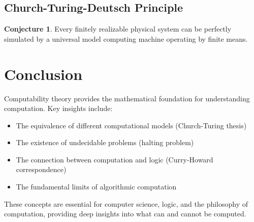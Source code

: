 \documentclass[11pt]{article}
\theoremstyle{definition}
\newtheorem{conjecture}{Conjecture}[section]
\begin{document}
\subsection{Church-Turing-Deutsch Principle}
\begin{conjecture}
Every finitely realizable physical system can be perfectly simulated by a universal model computing machine operating by finite means.
\end{conjecture}

\section{Conclusion}

Computability theory provides the mathematical foundation for understanding computation. Key insights include:

\begin{itemize}
    \item The equivalence of different computational models (Church-Turing thesis)
    \item The existence of undecidable problems (halting problem)
    \item The connection between computation and logic (Curry-Howard correspondence)
    \item The fundamental limits of algorithmic computation
\end{itemize}

These concepts are essential for computer science, logic, and the philosophy of computation, providing deep insights into what can and cannot be computed.
\end{document}
